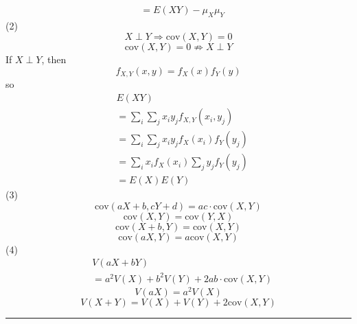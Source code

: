 \documentclass{article}
\begin{document}
\begin{multicols*}{3}
\begin{align*}
&=E(XY)-\mu_X\mu_Y
\end{align*}
(2) $$X\perp Y\Rightarrow \text{cov}(X,Y)=0$$
$$\text{cov}(X,Y)=0 \not\Rightarrow X\perp Y$$
If $X\perp Y$, then $$f_{X,Y}(x,y)=f_X(x)f_Y(y)$$
so 
\begin{align*}
&E(XY)\\
&=\sum_i\sum_j x_iy_jf_{X,Y}(x_i,y_j)\\
&=\sum_i\sum_jx_iy_jf_X(x_i)f_Y(y_j)\\
&=\sum_ix_if_X(x_i)\sum_jy_jf_Y(y_j)\\
&=E(X)E(Y)
\end{align*}
(3) $$\text{cov}(aX+b,cY+d)=ac\cdot\text{cov}(X,Y)$$
$$\text{cov}(X,Y)=\text{cov}(Y,X)$$
$$\text{cov}(X+b,Y)=\text{cov}(X,Y)$$
$$\text{cov}(aX,Y)=a\text{cov}(X,Y)$$
(4) 
\begin{align*}
&V(aX+bY)\\
&=a^2V(X)+b^2V(Y)+2ab\cdot\text{cov}(X,Y)
\end{align*}
$$V(aX)=a^2V(X)$$
$$V(X+Y)=V(X)+V(Y)+2\text{cov}(X,Y)$$
\rule{193pt}{0.2pt}

\end{multicols*}
\end{document}

